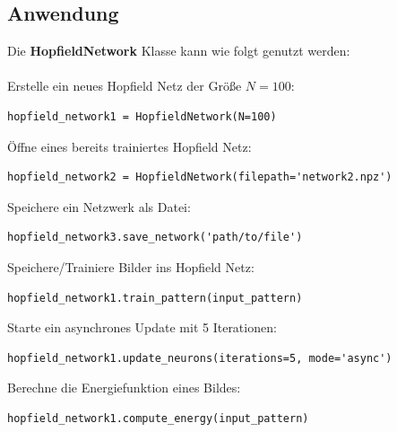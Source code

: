 \subsection{Anwendung}
Die \textbf{HopfieldNetwork} Klasse kann wie folgt genutzt werden:\\\\
Erstelle ein neues Hopfield Netz der Größe $N=100$:
\begin{verbatim}
hopfield_network1 = HopfieldNetwork(N=100)
\end{verbatim}
Öffne eines bereits trainiertes Hopfield Netz:
\begin{verbatim}
hopfield_network2 = HopfieldNetwork(filepath='network2.npz')
\end{verbatim}
Speichere ein Netzwerk als Datei:
\begin{verbatim}
hopfield_network3.save_network('path/to/file')
\end{verbatim}
Speichere/Trainiere Bilder ins Hopfield Netz:
\begin{verbatim}
hopfield_network1.train_pattern(input_pattern)
\end{verbatim}
Starte ein asynchrones Update mit 5 Iterationen:
\begin{verbatim}
hopfield_network1.update_neurons(iterations=5, mode='async')
\end{verbatim}
Berechne die Energiefunktion eines Bildes:
\begin{verbatim}
hopfield_network1.compute_energy(input_pattern)
\end{verbatim}



